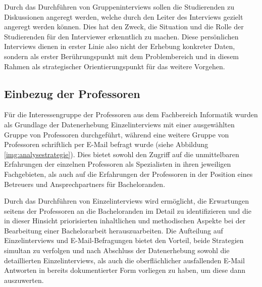 \documentclass[bibliography=totoc,listof=totoc,BCOR=5mm,DIV=12,oneside]{scrbook}
\begin{document}
\newpage
\par Durch das Durchführen von Gruppeninterviews sollen die Studierenden zu Diskussionen angeregt werden, welche durch den Leiter des Interviews gezielt angeregt werden können. Dies hat den Zweck, die Situation und die Rolle der Studierenden für den Interviewer erkenntlich zu machen.  Diese persönlichen Interviews dienen in erster Linie also nicht der Erhebung konkreter Daten, sondern als erster Berührungspunkt mit dem Problembereich und in diesem Rahmen als strategischer Orientierungspunkt für das weitere Vorgehen.

\subsection{Einbezug der Professoren}
\par Für die Interessengruppe der Professoren aus dem Fachbereich Informatik wurden als Grundlage der Datenerhebung Einzelinterviews mit einer ausgewählten Gruppe von Professoren durchgeführt, während eine weitere Gruppe von Professoren schriftlich per E-Mail befragt wurde (siehe Abbildung \ref{img:analysestrategie}). Dies bietet sowohl den Zugriff auf die unmittelbaren Erfahrungen der einzelnen Professoren als Spezialisten in ihren jeweiligen Fachgebieten, als auch auf die Erfahrungen der Professoren in der Position eines Betreuers und Ansprechpartners für Bacheloranden. 
\par \bigskip Durch das Durchführen von Einzelinterviews wird ermöglicht, die Erwartungen seitens der Professoren an die Bacheloranden im Detail zu identifizieren und die in dieser Hinsicht priorisierten inhaltlichen und methodischen Aspekte bei der Bearbeitung einer Bachelorarbeit herauszuarbeiten. Die Aufteilung auf Einzelinterviews und E-Mail-Befragungen bietet den Vorteil, beide Strategien simultan zu verfolgen und nach Abschluss der Datenerhebung sowohl die detaillierten Einzelinterviews, als auch die oberflächlicher ausfallenden E-Mail Antworten in bereits dokumentierter Form vorliegen zu haben, um diese dann auszuwerten.
\end{document}
